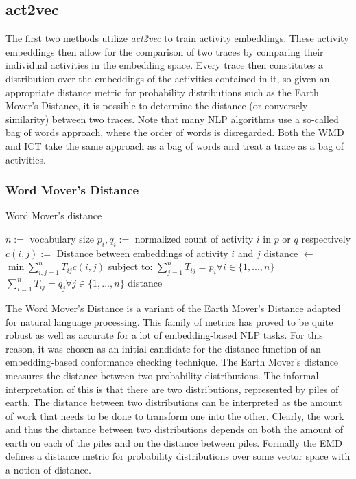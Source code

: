\documentclass[runningheads]{template/llncs}
\begin{document}
\subsection{act2vec}
The first two methods utilize \emph{act2vec} to train activity embeddings.
These activity embeddings then allow for the comparison of two traces by comparing their individual activities in the embedding space.
Every trace then constitutes a distribution over the embeddings of the activities contained in it, so given an appropriate distance metric for probability distributions such as the Earth Mover's Distance, it is possible to determine the distance (or conversely similarity) between two traces.
Note that many NLP algorithms use a so-called bag of words approach, where the order of words is disregarded.
Both the WMD and ICT take the same approach as a bag of words and treat a trace as a bag of activities.

\subsubsection{Word Mover's Distance}


\begin{algorithm}
	\caption{Word Mover's distance}\label{alg:wmd}
	\begin{algorithmic}
		\State $n:=$ vocabulary size
		\State $p_i,q_i := $ normalized count of activity $i$ in $p$ or $q$ respectively
		\State $c(i,j) :=$ Distance between embeddings of activity $i$ and $j$
		\State distance $\gets$ $\min \sum_{i,j=1}^n T_{ij}c(i,j)$
		\State subject to:
		\State $\sum_{j=1}^{n}T_{ij}=p_i \forall i \in \{1,...,n\}$ 
		\State $\sum_{i=1}^{n}T_{ij}=q_j \forall j \in \{1,...,n\}$ 
		\State \Return distance
		\EndFunction
	\end{algorithmic}
\end{algorithm}
The Word Mover's Distance \cite{KSKW15} is a variant of the Earth Mover's Distance \cite{RTGu98} adapted for natural language processing.
This family of metrics has proved to be quite robust as well as accurate for a lot of embedding-based NLP tasks.
For this reason, it was chosen as an initial candidate for the distance function of an embedding-based conformance checking technique.
The Earth Mover's distance measures the distance between two probability distributions.
The informal interpretation of this is that there are two distributions, represented by piles of earth.
The distance between two distributions can be interpreted as the amount of work that needs to be done to transform one into the other.
Clearly, the work and thus the distance between two distributions depends on both the amount of earth on each of the piles and on the distance between piles.
Formally the EMD defines a distance metric for probability distributions over some vector space with a notion of distance.
\end{document}
